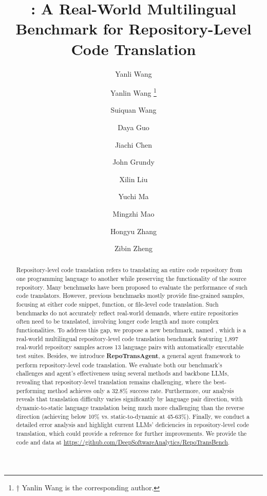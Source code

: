 \documentclass[lettersize,journal]{IEEEtran}
\begin{document}
\title{\toolname: A Real-World Multilingual Benchmark for Repository-Level Code Translation}

\author[1]{Yanli Wang}
\author[1,†]{Yanlin Wang \thanks{† Yanlin Wang is the corresponding author.}}
\author[1]{Suiquan Wang}
\author[1]{Daya Guo}
\author[1]{Jiachi Chen}
\author[2]{John Grundy}
\author[3]{Xilin Liu}
\author[3]{Yuchi Ma}
\author[1]{Mingzhi Mao}
\author[4]{Hongyu Zhang}
\author[1]{Zibin Zheng}



\maketitle

\begin{abstract}
Repository-level code translation refers to translating an entire code repository from one programming language to another while preserving the functionality of the source repository. Many benchmarks have been proposed to evaluate the performance of such code translators. However, previous benchmarks mostly provide fine-grained samples, focusing at either code snippet, function, or file-level code translation. Such benchmarks do not accurately reflect real-world demands, where entire repositories often need to be translated, involving longer code length and more complex functionalities.
To address this gap, we propose a new benchmark, named \textbf{\toolname}, which is a real-world multilingual repository-level code translation benchmark featuring 1,897 real-world repository samples across 13 language pairs with automatically executable test suites.
Besides, we introduce \textbf{RepoTransAgent}, a general agent framework to perform repository-level code translation.
We evaluate both our benchmark's challenges and agent's effectiveness using several methods and backbone LLMs, revealing that repository-level translation remains challenging, where the best-performing method achieves only a 32.8\% success rate.
Furthermore, our analysis reveals that translation difficulty varies significantly by language pair direction, with dynamic-to-static language translation being much more challenging than the reverse direction (achieving below 10\% vs. static-to-dynamic at 45-63\%).
Finally, we conduct a detailed error analysis and highlight current LLMs’ deficiencies in repository-level code translation, which could provide a reference for further improvements. 
We provide the code and data at \url{https://github.com/DeepSoftwareAnalytics/RepoTransBench}.
\end{abstract}
\end{document}
